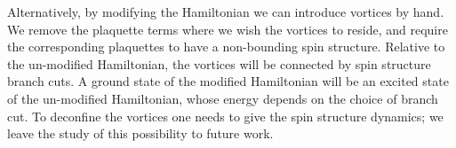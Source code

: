 
Alternatively, by modifying the Hamiltonian we can introduce vortices by hand. 
We remove the plaquette terms where we wish the vortices to reside, 
and require the corresponding plaquettes 
to have a non-bounding spin structure.
Relative to the un-modified Hamiltonian, 
the vortices will be connected by spin structure branch cuts.
A ground state of the modified Hamiltonian will be an excited state of the un-modified Hamiltonian, 
whose energy depends on the choice of branch cut.
To deconfine the vortices one needs to give the spin structure dynamics; 
we leave the study of this possibility to future work.

